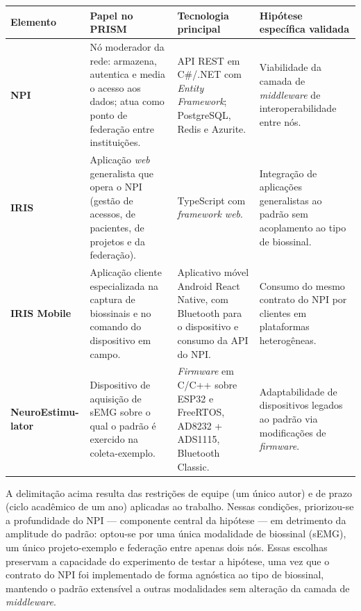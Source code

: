 \begin{tabframed}[htb]%
\caption{Síntese dos elementos desenvolvidos e suas contribuições à validação do PRISM}%
\label{quad:elementosDesenvolvidos}%
\centering
\begin{tabular}{|p{}|p{}|p{}|p{}|}%
\hline
\textbf{Elemento} & \textbf{Papel no PRISM} & \textbf{Tecnologia principal} & \textbf{Hipótese específica validada} \\ \hline
\textbf{NPI} & Nó moderador da rede: armazena, autentica e media o acesso aos dados; atua como ponto de federação entre instituições. & API REST em C\#/.NET com \textit{Entity Framework}; PostgreSQL, Redis e Azurite. & Viabilidade da camada de \textit{middleware} de interoperabilidade entre nós. \\ \hline
\textbf{IRIS} & Aplicação \textit{web} generalista que opera o NPI (gestão de acessos, de pacientes, de projetos e da federação). & TypeScript com \textit{framework web}. & Integração de aplicações generalistas ao padrão sem acoplamento ao tipo de biossinal. \\ \hline
\textbf{IRIS Mobile} & Aplicação cliente especializada na captura de biossinais e no comando do dispositivo em campo. & Aplicativo móvel Android React Native, com Bluetooth para o dispositivo e consumo da API do NPI. & Consumo do mesmo contrato do NPI por clientes em plataformas heterogêneas. \\ \hline
\textbf{NeuroEstimu- lator} & Dispositivo de aquisição de sEMG sobre o qual o padrão é exercido na coleta-exemplo. & \textit{Firmware} em C/C++ sobre ESP32 e FreeRTOS, AD8232 + ADS1115, Bluetooth Classic. & Adaptabilidade de dispositivos legados ao padrão via modificações de \textit{firmware}. \\ \hline
\end{tabular}
\fonte{}%
\end{tabframed}

A delimitação acima resulta das restrições de equipe (um único autor) e de prazo (ciclo acadêmico de um ano) aplicadas ao trabalho. Nessas condições, priorizou-se a profundidade do NPI --- componente central da hipótese --- em detrimento da amplitude do padrão: optou-se por uma única modalidade de biossinal (sEMG), um único projeto-exemplo e federação entre apenas dois nós. Essas escolhas preservam a capacidade do experimento de testar a hipótese, uma vez que o contrato do NPI foi implementado de forma agnóstica ao tipo de biossinal, mantendo o padrão extensível a outras modalidades sem alteração da camada de \textit{middleware}. 

